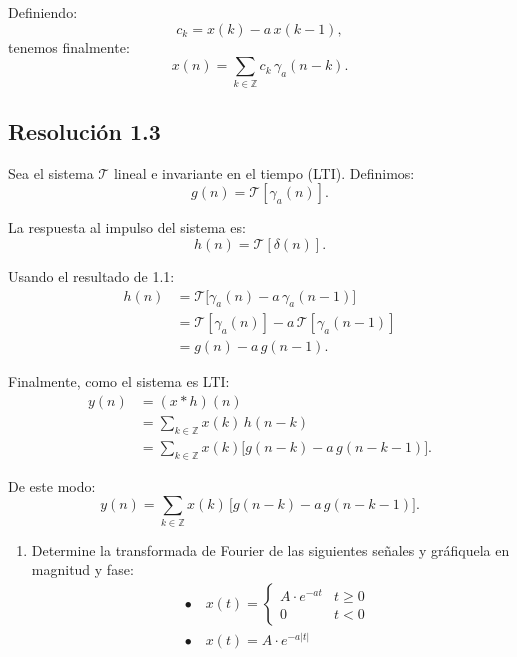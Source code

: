 \documentclass[
  11pt,
  letterpaper,
   addpoints,
   answers
  ]{exam}
\begin{document}
\begin{questions}
\begin{solution}
Definiendo:
\begin{equation}
c_k = x(k) - a\,x(k-1),
\end{equation}
tenemos finalmente:
\begin{equation}
x(n) = \sum_{k \in \mathbb{Z}} c_k\,\gamma_a(n-k).
\end{equation}

\subsection*{Resolución 1.3}
Sea el sistema \( \mathcal{T} \) lineal e invariante en el tiempo (LTI). Definimos:
\begin{equation}
g(n) = \mathcal{T}[\gamma_a(n)].
\end{equation}

La respuesta al impulso del sistema es:
\begin{equation}
h(n) = \mathcal{T}[\delta(n)].
\end{equation}

Usando el resultado de 1.1:
\begin{align}
h(n) &= \mathcal{T}\big[\gamma_a(n) - a\,\gamma_a(n-1)\big] \\
&= \mathcal{T}[\gamma_a(n)] - a\,\mathcal{T}[\gamma_a(n-1)] \\
&= g(n) - a\,g(n-1).
\end{align}

Finalmente, como el sistema es LTI:
\begin{align}
y(n) &= (x * h)(n) \\
&= \sum_{k \in \mathbb{Z}} x(k)\,h(n-k) \\
&= \sum_{k \in \mathbb{Z}} x(k)\Big[g(n-k) - a\,g(n-k-1)\Big].
\end{align}

De este modo:
\begin{equation}
y(n) = \sum_{k \in \mathbb{Z}} x(k)\,\big[g(n-k) - a\,g(n-k-1)\big].
\end{equation}

\end{solution}

\question
\begin{enumerate}
  \item Determine la transformada de Fourier de las siguientes señales y gráfiquela en magnitud y fase:
\begin{align*}
  &\bullet\quad x(t) = \begin{cases}
    A \cdot e^{-a t} & t \geq 0 \\
    0 & t < 0
  \end{cases} \\
  &\bullet\quad x(t) = A \cdot e^{-a|t|}
\end{align*}


\end{enumerate}
\end{questions}
\end{document}
